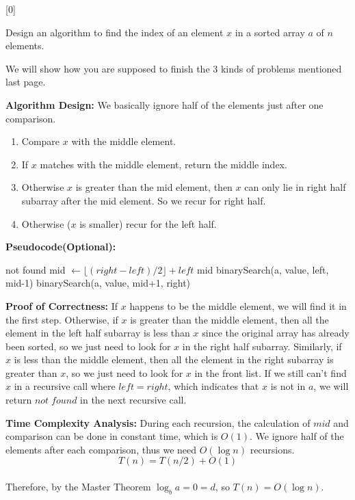[0]

Design an algorithm to find the index of an element $x$ in a sorted array $a$ of $n$ elements.

\begin{solution}

We will show how you are supposed to finish the $3$ kinds of problems mentioned last page.

\textbf{Algorithm Design:} We basically ignore half of the elements just after one comparison.
\begin{enumerate}
	\item Compare $x$ with the middle element.
	\item If $x$ matches with the middle element, return the middle index.
	\item Otherwise $x$ is greater than the mid element, then $x$ can only lie in right half subarray after the mid element. So we recur for right half.
	\item Otherwise ($x$ is smaller) recur for the left half.
\end{enumerate}

\textbf{Pseudocode(Optional):}
\begin{algorithm}[H]
    \color{blue}
	\begin{algorithmic}[1]
		\State \Return not found
		\EndIf
		\State mid $\gets \lfloor (right-left)/2 \rfloor + left$
		\State \Return mid
		\EndIf
		\State \Return binarySearch(a, value, left, mid-1)
		\Else
		\State \Return binarySearch(a, value, mid+1, right) 
		\EndIf   		
		\EndFunction
	\end{algorithmic}
\end{algorithm}

\textbf{Proof of Correctness:}
If $x$ happens to be the middle element, we will find it in the first step. Otherwise, if $x$ is greater than the middle element, then all the element in the left half subarray is less than $x$ since the original array has already been sorted, so we just need to look for $x$ in the right half subarray. Similarly, if $x$ is less than the middle element, then all the element in the right subarray is greater than $x$, so we just need to look for $x$ in the front list. If we still can't find $x$ in a recursive call where $left = right$, which indicates that $x$ is not in $a$, we will return $not\; found$ in the next recursive call.

\textbf{Time Complexity Analysis:}
During each recursion, the calculation of $mid$ and comparison can be done in constant time, which is $O(1)$. We ignore half of the elements after each comparison, thus we need $O(\log n)$ recursions.
$$T(n) = T(n/2)+O(1)$$\\
Therefore, by the Master Theorem $\log_{b}{a}=0=d$, so $T(n) = O(\log n)$.

\end{solution}
